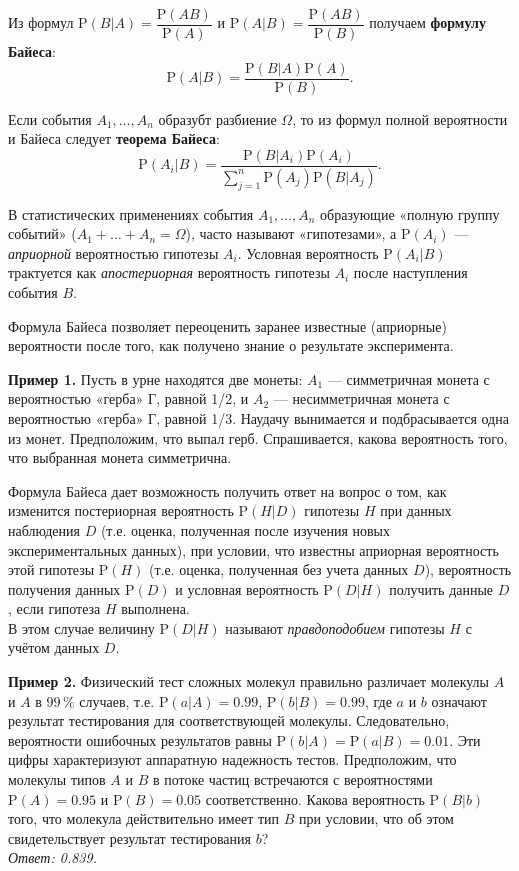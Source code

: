 \documentclass[11pt,a4paper]{article}
\begin{document}
Из формул \(\mathrm{P}(B|A) = \dfrac{\mathrm{P}(AB)}{\mathrm{P}(A)}\) и
\(\mathrm{P}(A|B) = \dfrac{\mathrm{P}(AB)}{\mathrm{P}(B)}\) получаем
\textbf{формулу Байеса}:
\[ \mathrm{P}(A|B) = \dfrac{\mathrm{P}(B|A) \mathrm{P}(A)}{\mathrm{P}(B)}. \]

Если события \(A_1, \dots, A_n\) образубт разбиение \(\Omega\), то из
формул полной вероятности и Байеса следует \textbf{теорема Байеса}:
\[ \mathrm{P}(A_i|B) = \frac{\mathrm{P}(B|A_i) \mathrm{P}(A_i)}{\sum_{j=1}^{n} \mathrm{P}(A_j) \mathrm{P}(B|A_j)}. \]

В статистических применениях события \(A_1, \dots, A_n\) образующие
«полную группу событий» (\(A_1 + \dots + A_n = \Omega\)), часто называют
«гипотезами», а \(\mathrm{P}(A_i)\) --- \emph{априорной} вероятностью
гипотезы \(A_i\). Условная вероятность \(\mathrm{P}(A_i|B)\) трактуется
как \emph{апостериорная} вероятность гипотезы \(A_i\) после наступления
события \(B\).

Формула Байеса позволяет переоценить заранее известные (априорные)
вероятности после того, как получено знание о результате эксперимента.

\textbf{Пример 1.} Пусть в урне находятся две монеты: \(A_1\) ---
симметричная монета с вероятностью «герба» Г, равной 1/2, и \(A_2\) ---
несимметричная монета с вероятностью «герба» Г, равной 1/3. Наудачу
вынимается и подбрасывается одна из монет. Предположим, что выпал герб.
Спрашивается, какова вероятность того, что выбранная монета симметрична.

    Формула Байеса дает возможность получить ответ на вопрос о том, как
изменится постериорная вероятность \(\mathrm{P}(H|D)\) гипотезы \(H\)
при данных наблюдения \(D\) (т.е. оценка, полученная после изучения
новых экспериментальных данных), при условии, что известны априорная
вероятность этой гипотезы \(\mathrm{P}(H)\) (т.е. оценка, полученная без
учета данных \(D\)), вероятность получения данных \(\mathrm{P}(D)\) и
условная вероятность \(\mathrm{P}(D|H)\) получить данные \(D\), если
гипотеза \(H\) выполнена.\\
В этом случае величину \(\mathrm{P}(D|H)\) называют
\emph{правдоподобием} гипотезы \(H\) с учётом данных \(D\).

\textbf{Пример 2.} Физический тест сложных молекул правильно различает
молекулы \(A\) и \(A\) в \(99\,\%\) случаев, т.е.
\(\mathrm{P}(a|A) = 0.99\), \(\mathrm{P}(b|B) = 0.99\), где \(a\) и
\(b\) означают результат тестирования для соответствующей молекулы.
Следовательно, вероятности ошибочных результатов равны
\(\mathrm{P}(b|A) = \mathrm{P}(a|B) = 0.01\). Эти цифры характеризуют
аппаратную надежность тестов. Предположим, что молекулы типов \(A\) и
\(B\) в потоке частиц встречаются с вероятностями
\(\mathrm{P}(A) = 0.95\) и \(\mathrm{P}(B) = 0.05\) соответственно.
Какова вероятность \(\mathrm{P}(B|b)\) того, что молекула действительно
имеет тип \(B\) при условии, что об этом свидетельствует результат
тестирования \(b\)?\\
\emph{Ответ: 0.839.}
\end{document}
